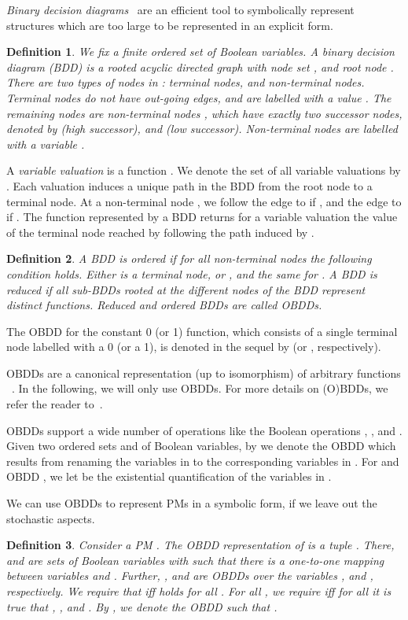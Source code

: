 \documentclass[10pt,twocolumn]{article}
\newtheorem{definition}{Definition}
\begin{document}
\noindent\emph{Binary decision diagrams}~\cite{Bry86} are an efficient tool to
symbolically represent structures which are too large to be represented in an
explicit form.
\begin{definition}
  \label{def:bdd}
  We fix a finite ordered set  of \emph{Boolean variables}.
  A \emph{binary decision diagram} (BDD) is a rooted acyclic directed graph
   with node set , and root node . There are two
  types of nodes in : terminal nodes, and non-terminal nodes.
  \emph{Terminal} nodes  do not have out-going edges, and are
  labelled with a value . The remaining nodes are
  \emph{non-terminal} nodes , which have exactly two successor nodes, denoted by
   (\emph{high} successor), and  (\emph{low} successor).
  Non-terminal nodes  are labelled with a variable
  .
\end{definition}
A \emph{variable valuation} is a function .
We denote the set of all variable valuations by .
Each valuation  induces a unique path in the BDD from the root node to a
terminal node.
At a non-terminal node , we follow the edge to  if
, and the edge to  if
. The function 
represented by a BDD  returns for a variable valuation  the value of
the terminal node reached by following the path induced by .
\begin{definition}
  \label{def:reduced_ordered}
  A BDD is \emph{ordered} if for all non-terminal nodes  the following condition
  holds.
  Either  is a terminal node, or , and the same for . A BDD is
  \emph{reduced} if all sub-BDDs rooted at the different nodes of the
  BDD represent distinct functions. Reduced and ordered BDDs are called
  \emph{OBDDs}.
\end{definition}

The OBDD for the constant 0 (or 1) function, which consists of a single 
terminal node labelled with a 0 (or a 1), is denoted in the sequel 
by  (or , respectively).

OBDDs are a canonical representation (up to isomorphism) of
arbitrary functions ~\cite{Bry86}. In the following, we
will only use OBDDs. For more details on (O)BDDs, we refer the reader
to~\cite{Bry86,Weg00}.

OBDDs support a wide number of operations like the Boolean operations ,
, and . Given two ordered sets  and
 of
Boolean variables, by  we denote the OBDD
which results from renaming the variables in  to the corresponding
variables in .
For  and OBDD , we let 
 be the existential quantification of the
variables in .

We can use OBDDs to represent PMs in a symbolic form, if we leave out the stochastic aspects.
\begin{definition}
  \label{def:bdd-repr}
  Consider a PM  .
  The \emph{OBDD representation} of  is a tuple .
  There,  and  are sets of Boolean variables with  such that there is a one-to-one mapping between variables  and .
  Further, , and  are OBDDs over the variables , and , respectively.
  We require that  iff  holds for all .
  For all , we require  iff for all  it is true
  that , , and .
  By , we denote the OBDD such that .
\end{definition}
\end{document}
